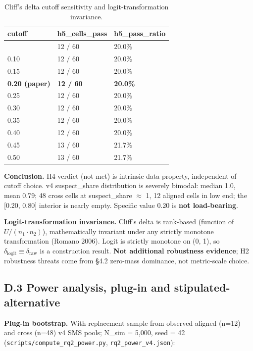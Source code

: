 \documentclass[acmsmall,screen,review]{acmart}
\begin{document}
{\def\LTcaptype{table} %
\begin{longtable}[]{@{}lll@{}}
\caption{Cliff's delta cutoff sensitivity and logit-transformation invariance.}\label{tab:p2-22}\\
\toprule\noalign{}
cutoff & h5\_cells\_pass & h5\_pass\_ratio \\
\midrule\noalign{}
\endfirsthead
\endhead
\bottomrule\noalign{}
\endlastfoot
0.05 & 12 / 60 & 20.0\% \\
0.10 & 12 / 60 & 20.0\% \\
0.15 & 12 / 60 & 20.0\% \\
\textbf{0.20 (paper)} & \textbf{12 / 60} & \textbf{20.0\%} \\
0.25 & 12 / 60 & 20.0\% \\
0.30 & 12 / 60 & 20.0\% \\
0.35 & 12 / 60 & 20.0\% \\
0.40 & 12 / 60 & 20.0\% \\
0.45 & 13 / 60 & 21.7\% \\
0.50 & 13 / 60 & 21.7\% \\
\end{longtable}
}

\textbf{Conclusion.} H4 verdict (not met) is intrinsic data property,
independent of cutoff choice. v4 suspect\_share distribution is severely
bimodal: median 1.0, mean 0.79; 48 cross cells at suspect\_share $\approx$ 1, 12
aligned cells in low end; the {[}0.20, 0.80{]} interior is nearly empty.
Specific value 0.20 is \textbf{not load-bearing}.

\textbf{Logit-transformation invariance.} Cliff's delta is rank-based
(function of $U / (n_1 \cdot n_2)$), mathematically invariant under any strictly
monotone transformation (Romano 2006). Logit is strictly monotone on (0,
1), so $\delta_{\mathrm{logit}} \equiv \delta_{\mathrm{raw}}$ is a construction result. \textbf{Not
additional robustness evidence}; H2 robustness threats come from §4.2
zero-mass dominance, not metric-scale choice.

\subsection{D.3 Power analysis, plug-in and stipulated-alternative}\label{d.3-power-analysis-plug-in-and-stipulated-alternative}

\textbf{Plug-in bootstrap.} With-replacement sample from observed
aligned (n=12) and cross (n=48) v4 SMS pools; N\_sim = 5,000, seed = 42
(\texttt{scripts/compute\_rq2\_power.py}, \texttt{rq2\_power\_v4.json}):
\end{document}

